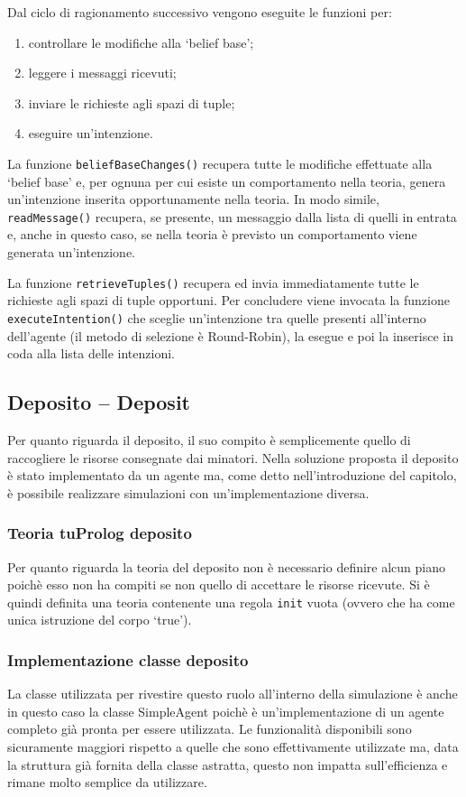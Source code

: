 Dal ciclo di ragionamento successivo vengono eseguite le funzioni per:
\begin{enumerate}
\item controllare le modifiche alla `belief base';
\item leggere i messaggi ricevuti;
\item inviare le richieste agli spazi di tuple;
\item eseguire un'intenzione.
\end{enumerate}
La funzione \texttt{beliefBaseChanges()} recupera tutte le modifiche effettuate alla `belief base' e, per ognuna per cui esiste un comportamento nella teoria, genera un'intenzione inserita opportunamente nella teoria. In modo simile, \texttt{readMessage()} recupera, se presente, un messaggio dalla lista di quelli in entrata e, anche in questo caso, se nella teoria è previsto un comportamento viene generata un'intenzione.

La funzione \texttt{retrieveTuples()} recupera ed invia immediatamente tutte le richieste agli spazi di tuple opportuni.
Per concludere viene invocata la funzione \texttt{executeIntention()} che sceglie un'intenzione tra quelle presenti all'interno dell'agente (il metodo di selezione è Round-Robin), la esegue e poi la inserisce in coda alla lista delle intenzioni.

\subsection{Deposito -- Deposit}
Per quanto riguarda il deposito, il suo compito è semplicemente quello di raccogliere le risorse consegnate dai minatori.
Nella soluzione proposta il deposito è stato implementato da un agente ma, come detto nell'introduzione del capitolo, è possibile realizzare simulazioni con un'implementazione diversa.

\subsubsection{Teoria tuProlog deposito}
Per quanto riguarda la teoria del deposito non è necessario definire alcun piano poichè esso non ha compiti se non quello di accettare le risorse ricevute. Si è quindi definita una teoria contenente una regola \texttt{init} vuota (ovvero che ha come unica istruzione del corpo `true').

\subsubsection{Implementazione classe deposito}
La classe utilizzata per rivestire questo ruolo all'interno della simulazione è anche in questo caso la classe SimpleAgent poichè è un'implementazione di un agente completo già pronta per essere utilizzata.
%
Le funzionalità disponibili sono sicuramente maggiori rispetto a quelle che sono effettivamente utilizzate ma, data la struttura già fornita della classe astratta, questo non impatta sull'efficienza e rimane molto semplice da utilizzare.

